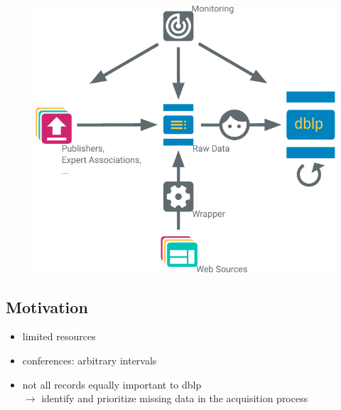 \documentclass[xcolor={svgnames}]{beamer}
\makeatletter
\newcommand*{\currentname}{\@currentlabelname}
\makeatother
\begin{document}
\begin{frame}{\currentname}{}\linespread{1.5}
  \begin{figure}
    \begin{center}
      \includegraphics[width=\textwidth,height=0.8\textheight,keepaspectratio]{img/dblp-sources.pdf}
    \end{center}
  \end{figure}
\end{frame}

\subsection{Motivation}

\begin{frame}{\currentname}{}\linespread{1.5}
  \begin{itemize}
    \item limited resources
    \item conferences: arbitrary intervals
    \item not all records equally important to dblp \\
      \( \rightarrow \) identify and prioritize missing data in the acquisition process

  \end{itemize}
\end{frame}
\end{document}
